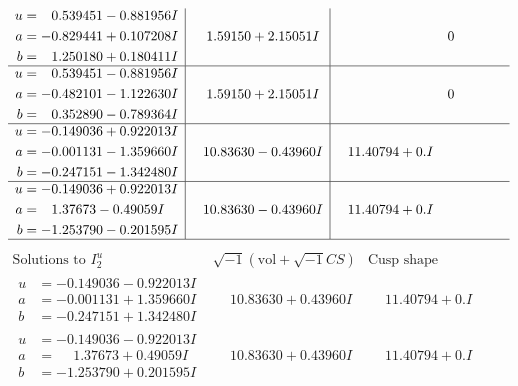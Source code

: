\documentclass[1p]{elsarticle_modified}
\theoremstyle{definition}
\newcommand{\I}{\sqrt{-1}}
\begin{document}
$$\begin{array}{c|c|c}
\begin{aligned}
u &= \phantom{-}0.539451 - 0.881956 I \\
a &= -0.829441 + 0.107208 I \\
b &= \phantom{-}1.250180 + 0.180411 I\end{aligned}
 & \phantom{-}1.59150 + 2.15051 I & \phantom{-0.000000 } 0 \\ \hline\begin{aligned}
u &= \phantom{-}0.539451 - 0.881956 I \\
a &= -0.482101 - 1.122630 I \\
b &= \phantom{-}0.352890 - 0.789364 I\end{aligned}
 & \phantom{-}1.59150 + 2.15051 I & \phantom{-0.000000 } 0 \\ \hline\begin{aligned}
u &= -0.149036 + 0.922013 I \\
a &= -0.001131 - 1.359660 I \\
b &= -0.247151 - 1.342480 I\end{aligned}
 & \phantom{-}10.83630 - 0.43960 I & \phantom{-}11.40794 + 0. I\phantom{ +0.000000I} \\ \hline\begin{aligned}
u &= -0.149036 + 0.922013 I \\
a &= \phantom{-}1.37673 - 0.49059 I \\
b &= -1.253790 - 0.201595 I\end{aligned}
 & \phantom{-}10.83630 - 0.43960 I & \phantom{-}11.40794 + 0. I\phantom{ +0.000000I}\\
 \hline 
 \end{array}$$\newpage$$\begin{array}{c|c|c}  
\text{Solutions to }I^u_{2}& \I (\text{vol} + \sqrt{-1}CS) & \text{Cusp shape}\\
 \hline 
\begin{aligned}
u &= -0.149036 - 0.922013 I \\
a &= -0.001131 + 1.359660 I \\
b &= -0.247151 + 1.342480 I\end{aligned}
 & \phantom{-}10.83630 + 0.43960 I & \phantom{-}11.40794 + 0. I\phantom{ +0.000000I} \\ \hline\begin{aligned}
u &= -0.149036 - 0.922013 I \\
a &= \phantom{-}1.37673 + 0.49059 I \\
b &= -1.253790 + 0.201595 I\end{aligned}
 & \phantom{-}10.83630 + 0.43960 I & \phantom{-}11.40794 + 0. I\phantom{ +0.000000I} \\ \hline\begin{aligned}

\end{aligned}
\end{array}$$
\end{document}
